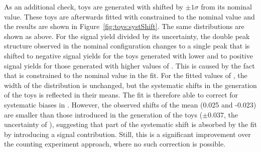 As an additional check, toys are generated with \Rsfof shifted by $\pm1\sigma$ from its nominal value. These toys are afterwards fitted with \Rsfof constrained to the nominal value and the results are shown in Figure~\ref{fig:toys:systShift}. The same distributions are shown as above. For the signal yield divided by its uncertainty, the double peak structure observed in the nominal configuration changes to a single peak that is shifted to negative signal yields for the toys generated with lower and to positive signal yields for those generated with higher values of \Rsfof. This is caused by the fact that \Rsfof is constrained to the nominal value in the fit. For the fitted values of \Rsfof, the width of the distribution is unchanged, but the systematic shifts in the generation of the toys is reflected in their means. The fit is therefore able to correct for systematic biases in \Rsfof. However, the observed shifts of the mean (0.025 and -0.023) are smaller than those introduced in the generation of the toys ($\pm0.037$, the uncertainty of \Rsfof), suggesting that part of the systematic shift is absorbed by the fit by introducing a signal contribution. Still, this is a significant improvement over the counting experiment approach, where no such correction is possible.  
